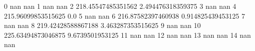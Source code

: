 0 nan nan
1 nan nan
2 218.45547485351562 2.494476318359375
3 nan nan
4 215.96099853515625 0.0
5 nan nan
6 216.87582397460938 0.914825439453125
7 nan nan
8 219.42428588867188 3.463287353515625
9 nan nan
10 225.63494873046875 9.6739501953125
11 nan nan
12 nan nan
13 nan nan
14 nan nan
